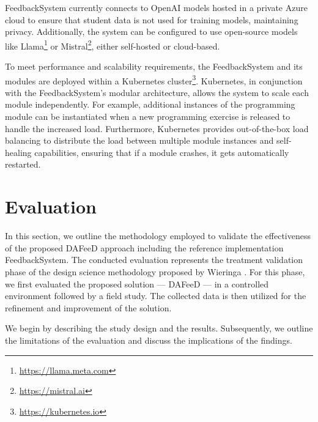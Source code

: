 \documentclass[sigconf,screen,review,anonymous]{acmart}
\begin{document}
FeedbackSystem currently connects to OpenAI models hosted in a private Azure cloud to ensure that student data is not used for training models, maintaining privacy.
Additionally, the system can be configured to use open-source models like Llama\footnote{\url{https://llama.meta.com}} or Mistral\footnote{\url{https://mistral.ai}}, either self-hosted or cloud-based.

To meet performance and scalability requirements, the FeedbackSystem and its modules are deployed within a Kubernetes cluster\footnote{\url{https://kubernetes.io}}.
Kubernetes, in conjunction with the FeedbackSystem's modular architecture, allows the system to scale each module independently.
For example, additional instances of the programming module can be instantiated when a new programming exercise is released to handle the increased load.
Furthermore, Kubernetes provides out-of-the-box load balancing to distribute the load between multiple module instances and self-healing capabilities, ensuring that if a module crashes, it gets automatically restarted.

\section{Evaluation} %
\label{sec:evaluation}

In this section, we outline the methodology employed to validate the effectiveness of the proposed DAFeeD approach including the reference implementation FeedbackSystem.
The conducted evaluation represents the treatment validation phase of the design science methodology proposed by Wieringa \cite{wieringa:2014:DesignScienceMethodologya}.
For this phase, we first evaluated the proposed solution — DAFeeD — in a controlled environment followed by a field study.
The collected data is then utilized for the refinement and improvement of the solution.

We begin by describing the study design and the results.
Subsequently, we outline the limitations of the evaluation and discuss the implications of the findings.



\end{document}
